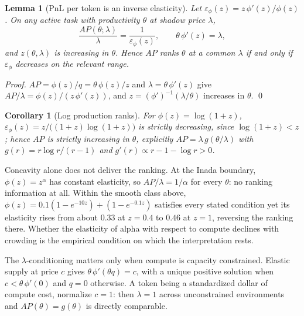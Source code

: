 \documentclass[preprint,11pt,authoryear]{elsarticle}
\newtheorem{lemma}{Lemma}
\newtheorem{corollary}{Corollary}
\begin{document}
\begin{lemma}[PnL per token is an inverse elasticity]
\label{lem:ap}
Let $\varepsilon_\phi(z) = z\,\phi'(z)/\phi(z)$. On any active task with productivity $\theta$ at shadow price $\lambda$,
\begin{equation}
\frac{AP(\theta;\lambda)}{\lambda} = \frac{1}{\varepsilon_\phi(z)},
\qquad
\theta\,\phi'(z) = \lambda,
\end{equation}
and $z(\theta,\lambda)$ is increasing in $\theta$. Hence $AP$ ranks $\theta$ at a common $\lambda$ if and only if $\varepsilon_\phi$ decreases on the relevant range.
\end{lemma}

\begin{proof}
$AP = \phi(z)/q = \theta\,\phi(z)/z$ and $\lambda = \theta\,\phi'(z)$ give $AP/\lambda = \phi(z)/(z\,\phi'(z))$, and $z = (\phi')^{-1}(\lambda/\theta)$ increases in $\theta$. \qed
\end{proof}

\begin{corollary}[Log production ranks]
\label{cor:log}
For $\phi(z) = \log(1+z)$, $\varepsilon_\phi(z) = z/\big((1+z)\log(1+z)\big)$ is strictly decreasing, since $\log(1+z) < z$; hence $AP$ is strictly increasing in $\theta$, explicitly $AP = \lambda\, g(\theta/\lambda)$ with $g(r) = r\log r/(r-1)$ and $g'(r) \propto r - 1 - \log r > 0$.
\end{corollary}

Concavity alone does not deliver the ranking. At the Inada boundary, $\phi(z) = z^\alpha$ has constant elasticity, so $AP/\lambda = 1/\alpha$ for every $\theta$: no ranking information at all. Within the smooth class above, $\phi(z) = 0.1(1 - e^{-10z}) + (1 - e^{-0.1z})$ satisfies every stated condition yet its elasticity rises from about $0.33$ at $z = 0.4$ to $0.46$ at $z = 1$, reversing the ranking there. Whether the elasticity of alpha with respect to compute declines with crowding is the empirical condition on which the interpretation rests.

\begin{remark}[Elastic compute pins $\lambda = 1$]
\label{rem:elastic}
The $\lambda$-conditioning matters only when compute is capacity constrained. Elastic supply at price $c$ gives $\theta\,\phi'(\theta q) = c$, with a unique positive solution when $c < \theta\,\phi'(0)$ and $q = 0$ otherwise. A token being a standardized dollar of compute cost, normalize $c = 1$: then $\lambda = 1$ across unconstrained environments and $AP(\theta) = g(\theta)$ is directly comparable.
\end{remark}
\end{document}
